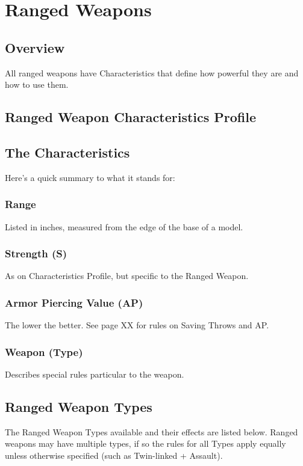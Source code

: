 
\chapter{Ranged Weapons}

\section{Overview}
All ranged weapons have Characteristics that define how
powerful they are and how to use them.

\section{Ranged Weapon Characteristics Profile}

\makeweapon

\section{The Characteristics}

Here's a quick summary to what it stands for:

\subsection{Range}
Listed in inches, measured from the edge of the base of a
model.
\subsection{Strength (S)}
As on Characteristics Profile, but specific to the Ranged
Weapon.
\subsection{Armor Piercing Value (AP)}
The lower the better. See page XX for rules on Saving Throws
and AP.
\subsection{Weapon (Type)}
Describes special rules particular to the weapon.


\section{Ranged Weapon Types}
The Ranged Weapon Types available and their effects are
listed below. Ranged weapons may have multiple types, if so
the rules for all Types apply equally unless otherwise specified
(such as Twin-linked + Assault).


